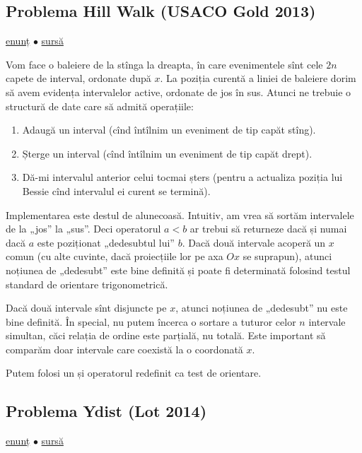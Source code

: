 \documentclass[../main.tex]{subfiles}
\begin{document}
\subsection{Problema Hill Walk (USACO Gold 2013)}
\label{problem:hill-walk}

\href{https://usaco.org/index.php?page=viewproblem2\&cpid=266}{enunț}
$\bullet$
\hyperref[code:hill-walk]{sursă}

Vom face o baleiere de la stînga la dreapta, în care evenimentele sînt cele $2n$ capete de interval, ordonate după $x$. La poziția curentă a liniei de baleiere dorim să avem evidența intervalelor active, ordonate de jos în sus. Atunci ne trebuie o structură de date care să admită operațiile:

\begin{enumerate}
  \item Adaugă un interval (cînd întîlnim un eveniment de tip capăt stîng).
  \item Șterge un interval (cînd întîlnim un eveniment de tip capăt drept).
  \item Dă-mi intervalul anterior celui tocmai șters (pentru a actualiza poziția lui Bessie cînd intervalul ei curent se termină).
\end{enumerate}

Implementarea este destul de alunecoasă. Intuitiv, am vrea să sortăm intervalele de la „jos” la „sus”. Deci operatorul $a < b$ ar trebui să returneze  dacă și numai dacă $a$ este poziționat „dedesubtul lui” $b$. Dacă două intervale acoperă un $x$ comun (cu alte cuvinte, dacă proiecțiile lor pe axa $Ox$ se suprapun), atunci noțiunea de „dedesubt” este bine definită și poate fi determinată folosind testul standard de orientare trigonometrică.

Dacă două intervale sînt disjuncte pe $x$, atunci noțiunea de „dedesubt” nu este bine definită. În special, nu putem încerca o sortare a tuturor celor $n$ intervale simultan, căci relația de ordine este parțială, nu totală. Este important să comparăm doar intervale care coexistă la o coordonată $x$.

Putem folosi un  și operatorul \ccode{<} redefinit ca test de orientare.

\subsection{Problema Ydist (Lot 2014)}
\label{problem:ydist}

\href{https://kilonova.ro/problems/2010}{enunț}
$\bullet$
\hyperref[code:ydist]{sursă}
\end{document}
